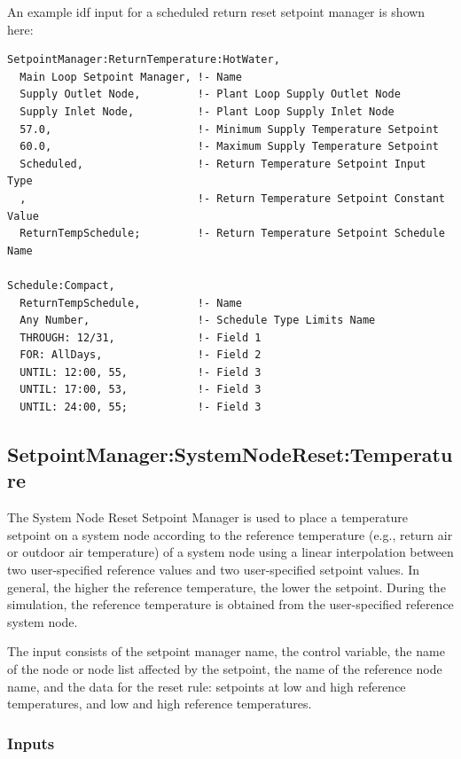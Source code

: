 An example idf input for a scheduled return reset setpoint manager is shown here:

\begin{lstlisting}
SetpointManager:ReturnTemperature:HotWater,
  Main Loop Setpoint Manager, !- Name
  Supply Outlet Node,         !- Plant Loop Supply Outlet Node
  Supply Inlet Node,          !- Plant Loop Supply Inlet Node
  57.0,                       !- Minimum Supply Temperature Setpoint
  60.0,                       !- Maximum Supply Temperature Setpoint
  Scheduled,                  !- Return Temperature Setpoint Input Type
  ,                           !- Return Temperature Setpoint Constant Value
  ReturnTempSchedule;         !- Return Temperature Setpoint Schedule Name

Schedule:Compact,
  ReturnTempSchedule,         !- Name
  Any Number,                 !- Schedule Type Limits Name
  THROUGH: 12/31,             !- Field 1
  FOR: AllDays,               !- Field 2
  UNTIL: 12:00, 55,           !- Field 3
  UNTIL: 17:00, 53,           !- Field 3
  UNTIL: 24:00, 55;           !- Field 3
\end{lstlisting}

\subsection{SetpointManager:SystemNodeReset:Temperature}\label{setpointmanagersystemnoderesettemperature}

The System Node Reset Setpoint Manager is used to place a temperature setpoint on a system node according to the reference temperature (e.g., return air or outdoor air temperature) of a system node using a linear interpolation between two user-specified reference values and two user-specified setpoint values. In general, the higher the reference temperature, the lower the setpoint. During the simulation, the reference temperature is obtained from the user-specified reference system node.

The input consists of the setpoint manager name, the control variable, the name of the node or node list affected by the setpoint, the name of the reference node name, and the data for the reset rule: setpoints at low and high reference temperatures, and low and high reference temperatures.

\subsubsection{Inputs}

